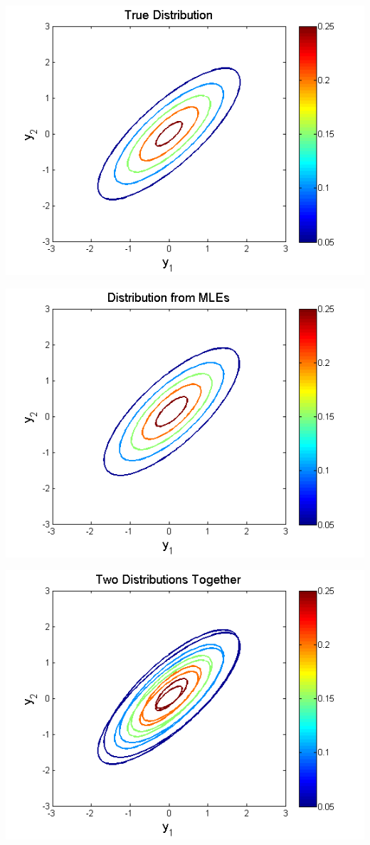 \documentclass{article}
\begin{document}
\begin{enumerate}
\begin{left}
\includegraphics[scale=0.5]{TrueDist.png}
\end{left}
\begin{right}
\includegraphics[scale=0.5]{MLEDist.png}\\
\end{right}
\begin{center}
\includegraphics[scale=0.5]{TrueAndMLE.png}\\

\end{center}
\end{enumerate}
\end{document}
